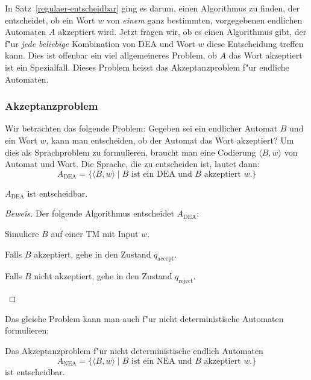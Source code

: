In Satz~\ref{regulaer-entscheidbar} ging es darum, einen Algorithmus
zu finden, der entscheidet, ob ein Wort $w$ von {\em einem} ganz bestimmten,
vorgegebenen endlichen Automaten $A$ akzeptiert wird.
Jetzt fragen wir, ob es einen Algorithmus gibt, der f"ur {\em jede beliebige}
Kombination von DEA und Wort $w$ diese Entscheidung treffen kann.
Dies ist offenbar ein viel allgemeineres Problem, ob $A$ das Wort
akzeptiert ist ein Spezialfall.
Dieses Problem heisst das
Akzeptanzproblem f"ur endliche Automaten.

\subsubsection{Akzeptanzproblem}
%
Wir betrachten das folgende Problem: Gegeben sei ein endlicher Automat $B$
und ein Wort $w$,
kann man entscheiden, ob der Automat das Wort akzeptiert?
Um dies als Sprachproblem zu formulieren, braucht  man eine Codierung
$\langle B,w\rangle$ von Automat und Wort.
Die Sprache, die zu
entscheiden ist, lautet dann:
\[
A_{\text{DEA}} =\{
\langle B,w\rangle\;|\;\text{$B$ ist ein DEA und $B$ akzeptiert $w$}.
\}
\]
%
\begin{satz}
\label{adea_decidable}
$A_{\text{DEA}}$ ist entscheidbar.
\end{satz}
%

\begin{proof}[Beweis]
Der folgende Algorithmus entscheidet
$A_{\text{DEA}}$:
\medskip
\begin{compactenum}
\item Simuliere $B$ auf einer TM mit Input $w$.
\item Falls $B$ akzeptiert, gehe in den Zustand $q_{\text{accept}}$.
\item Falls $B$ nicht akzeptiert, gehe in den Zustand $q_{\text{reject}}$.
\end{compactenum}
\medskip
\end{proof}

Das gleiche Problem kann man auch f"ur nicht deterministische Automaten
formulieren:

\begin{satz}
%
Das Akzeptanzproblem f"ur nicht deterministische endlich Automaten
\[
A_{\text{NEA}} =\{
\langle B,w\rangle\;|\;\text{$B$ ist ein NEA und $B$ akzeptiert $w$}.
\}
\]
%
ist entscheidbar.
\end{satz}

